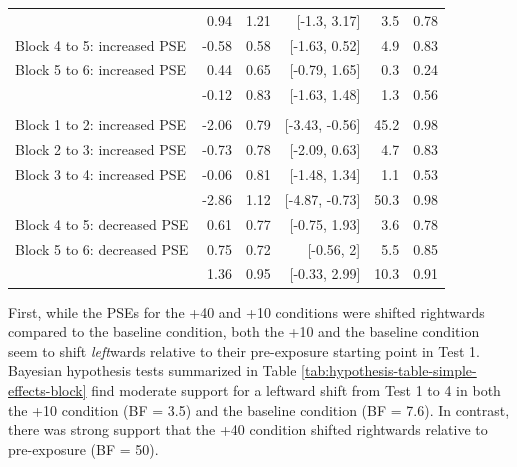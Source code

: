 \documentclass[
  11pt,
  man,mask,floatsintext]{apa6}
\begin{document}
\begin{table}[H]
\begin{tabular}[t]{>{\raggedright\arraybackslash}p{15em}rrrrr}
\hspace{1em}{\em Block 1 to 4: decreased PSE} & 0.94 & 1.21 & {}[-1.3, 3.17] & 3.5 & 0.78\\
\hspace{1em}Block 4 to 5: increased PSE & -0.58 & 0.58 & {}[-1.63, 0.52] & 4.9 & 0.83\\
\hspace{1em}Block 5 to 6: increased PSE & 0.44 & 0.65 & {}[-0.79, 1.65] & 0.3 & 0.24\\
\hspace{1em}{\em Block 4 to 6: increased PSE} & -0.12 & 0.83 & {}[-1.63, 1.48] & 1.3 & 0.56\\
\addlinespace[0.3em]
\multicolumn{6}{l}{\textbf{Difference between blocks: +40}}\\
\hspace{1em}Block 1 to 2: increased PSE & -2.06 & 0.79 & {}[-3.43, -0.56] & 45.2 & 0.98\\
\hspace{1em}Block 2 to 3: increased PSE & -0.73 & 0.78 & {}[-2.09, 0.63] & 4.7 & 0.83\\
\hspace{1em}Block 3 to 4: increased PSE & -0.06 & 0.81 & {}[-1.48, 1.34] & 1.1 & 0.53\\
\hspace{1em}{\em Block 1 to 4: increased PSE} & -2.86 & 1.12 & {}[-4.87, -0.73] & 50.3 & 0.98\\
\hspace{1em}Block 4 to 5: decreased PSE & 0.61 & 0.77 & {}[-0.75, 1.93] & 3.6 & 0.78\\
\hspace{1em}Block 5 to 6: decreased PSE & 0.75 & 0.72 & {}[-0.56, 2] & 5.5 & 0.85\\
\hspace{1em}{\em Block 4 to 6: decreased PSE} & 1.36 & 0.95 & {}[-0.33, 2.99] & 10.3 & 0.91\\
\bottomrule
\end{tabular}
\end{table}

First, while the PSEs for the +40 and +10 conditions were shifted rightwards compared to the baseline condition, both the +10 and the baseline condition seem to shift \emph{left}wards relative to their pre-exposure starting point in Test 1. Bayesian hypothesis tests summarized in Table \ref{tab:hypothesis-table-simple-effects-block} find moderate support for a leftward shift from Test 1 to 4 in both the +10 condition (BF = 3.5) and the baseline condition (BF = 7.6). In contrast, there was strong support that the +40 condition shifted rightwards relative to pre-exposure (BF = 50).
\end{document}
